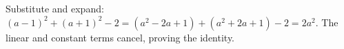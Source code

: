 Substitute and expand: $(a-1)^2+(a+1)^2-2=(a^2-2a+1)+(a^2+2a+1)-2=2a^2$. The linear and constant terms cancel, proving the identity.
